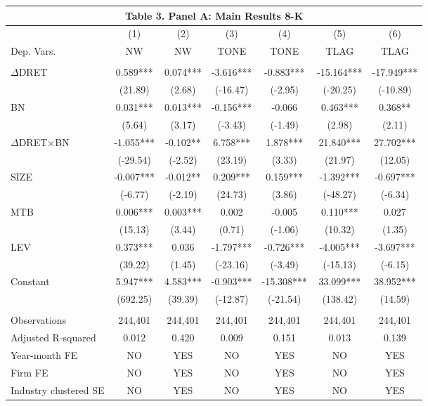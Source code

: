 \begin{table}[htbp] \label{T3PA}
  \centering
    \begin{tabular}{lcccccc}
    \multicolumn{7}{c}{\textbf{Table 3. Panel A: Main Results 8-K}} \\
    \midrule
      & (1) & (2) & (3) & (4) & (5) & (6) \\
    Dep. Vars. & NW & NW & TONE & TONE & TLAG & TLAG \\
    \midrule
      &   &   &   &   &   &  \\
    $\Delta$DRET & 0.589*** & 0.074*** & -3.616*** & -0.883*** & -15.164*** & -17.949*** \\
      & (21.89) & (2.68) & (-16.47) & (-2.95) & (-20.25) & (-10.89) \\
    BN & 0.031*** & 0.013*** & -0.156*** & -0.066 & 0.463*** & 0.368** \\
      & (5.64) & (3.17) & (-3.43) & (-1.49) & (2.98) & (2.11) \\
    \rowcolor[rgb]{ .933,  .925,  .882} $\Delta$DRET$\times$BN & -1.055*** & -0.102** & 6.758*** & 1.878*** & 21.840*** & 27.702*** \\
    \rowcolor[rgb]{ .933,  .925,  .882}   & (-29.54) & (-2.52) & (23.19) & (3.33) & (21.97) & (12.05) \\
    SIZE & -0.007*** & -0.012** & 0.209*** & 0.159*** & -1.392*** & -0.697*** \\
      & (-6.77) & (-2.19) & (24.73) & (3.86) & (-48.27) & (-6.34) \\
    MTB & 0.006*** & 0.003*** & 0.002 & -0.005 & 0.110*** & 0.027 \\
      & (15.13) & (3.44) & (0.71) & (-1.06) & (10.32) & (1.35) \\
    LEV & 0.373*** & 0.036 & -1.797*** & -0.726*** & -4.005*** & -3.697*** \\
      & (39.22) & (1.45) & (-23.16) & (-3.49) & (-15.13) & (-6.15) \\
    Constant & 5.947*** & 4.583*** & -0.903*** & -15.308*** & 33.099*** & 38.952*** \\
      & (692.25) & (39.39) & (-12.87) & (-21.54) & (138.42) & (14.59) \\
      &   &   &   &   &   &  \\
    Observations & 244,401 & 244,401 & 244,401 & 244,401 & 244,401 & 244,401 \\
    Adjusted R-squared & 0.012 & 0.420 & 0.009 & 0.151 & 0.013 & 0.139 \\
    Year-month FE & NO & YES & NO & YES & NO & YES \\
    Firm FE & NO & YES & NO & YES & NO & YES \\
    Industry clustered SE & NO & YES & NO & YES & NO & YES \\
    \bottomrule
    \end{tabular}%
\end{table}%
